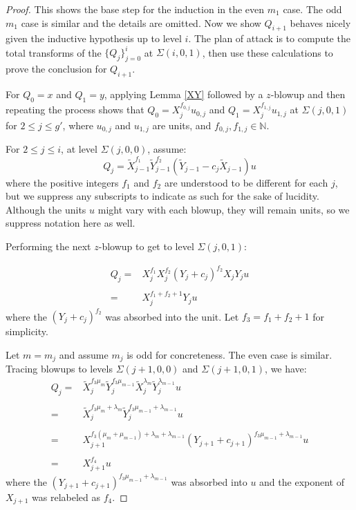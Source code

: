 \documentclass[10pt,a4paper]{amsart}
\begin{document}
\begin{proof}
This shows the base step for the induction in the even $m_1$ case. The odd $m_1$ case is similar and the details are omitted. Now we show $Q_{i+1}$ behaves nicely given the inductive hypothesis up to level $i$. The plan of attack is to compute the total transforms of the $\{Q_j\}_{j=0}^{i}$ at $\Sigma(i,0,1)$, then use these calculations to prove the conclusion for $Q_{i+1}$.

For $Q_0=x$ and $Q_1=y$, applying Lemma \ref{XY} followed by a $z$-blowup and then repeating the process shows that $Q_0=X_j^{f_{0,j}}u_{0,j}$ and $Q_1=X_j^{f_{1,j}}u_{1,j}$ at $\Sigma(j,0,1)$ for $2\leq j \leq g'$, where $u_{0,j}$ and $u_{1,j}$ are units, and $f_{0,j},f_{1,j}\in\mathbb{N}$.

For $2\leq j \leq i$, at level $\Sigma(j,0,0)$, assume:
\begin{equation*}
Q_j=\tilde X_{j-1}^{f_1} \tilde Y_{j-1}^{f_2} \left(\tilde Y_{j-1} - c_j \tilde X_{j-1}\right) u
\end{equation*}
where the positive integers $f_1$ and $f_2$ are understood to be different for each $j$, but we suppress any subscripts to indicate as such for the sake of lucidity. Although the units $u$ might vary with each blowup, they will remain units, so we suppress notation here as well.

Performing the next $z$-blowup to get to level $\Sigma(j,0,1)$:

\begin{equation*}
\begin{array}{rl}
\displaystyle Q_j= & X_{j}^{f_1}X_{j}^{f_2}\left(Y_{j}+c_j\right)^{f_2}X_{j}Y_{j} u
\\\\
\displaystyle = & X_{j}^{f_1+f_2+1}Y_{j} u
\end{array}
\end{equation*}
where the $\left(Y_{j}+c_j\right)^{f_2}$ was absorbed into the unit. Let $f_3=f_1+f_2+1$ for simplicity.

Let $m=m_j$ and assume $m_j$ is odd for concreteness. The even case is similar. Tracing blowups to levels $\Sigma(j+1,0,0)$ and $\Sigma(j+1,0,1)$, we have:
\begin{equation*}
\begin{array}{rl}
\displaystyle Q_j=&\tilde X_{j}^{f_3\mu_{m}} \tilde Y_{j}^{f_3\mu_{m-1}} \tilde X_{j}^{\lambda_{m}} \tilde Y_{j}^{\lambda_{m-1}}u
\\\\
\displaystyle =&\tilde X_{j}^{f_3\mu_{m}+\lambda_m} \tilde Y_{j}^{f_3\mu_{m-1}+\lambda_{m-1}}u
\\\\
\displaystyle =& X_{j+1}^{f_3(\mu_{m}+\mu_{m-1})+\lambda_m+\lambda_{m-1}} (Y_{j+1}+c_{j+1})^{f_3\mu_{m-1}+\lambda_{m-1}}u
\\\\
\displaystyle =& X_{j+1}^{f_4}u
\end{array}
\end{equation*}
where the $(Y_{j+1}+c_{j+1})^{f_3\mu_{m-1}+\lambda_{m-1}}$ was absorbed into $u$ and the exponent of $X_{j+1}$ was relabeled as $f_4$.


\end{proof}
\end{document}

